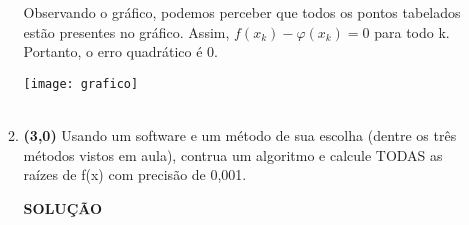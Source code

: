 \documentclass[a4paper, 12pt]{article}
\begin{document}
\begin{enumerate}
\begin{enumerate}
		Observando o gráfico, podemos perceber que todos os
		pontos tabelados estão presentes no gráfico.
		Assim, $f(x_k) - \varphi (x_k) = 0$ para todo k. Portanto, o erro quadrático é 0.
		
		\texttt{[image: grafico]}		
		\\ \\
		\item \textbf{(3,0)} Usando um software e um método de sua escolha (dentre os três métodos
		vistos em aula), contrua um algoritmo e calcule TODAS as raízes de f(x) com precisão de 0,001.
		
		\begin{center} \textbf{SOLUÇÃO} \\ \end{center}

		
	\end{enumerate}
\end{enumerate}
\end{document}
